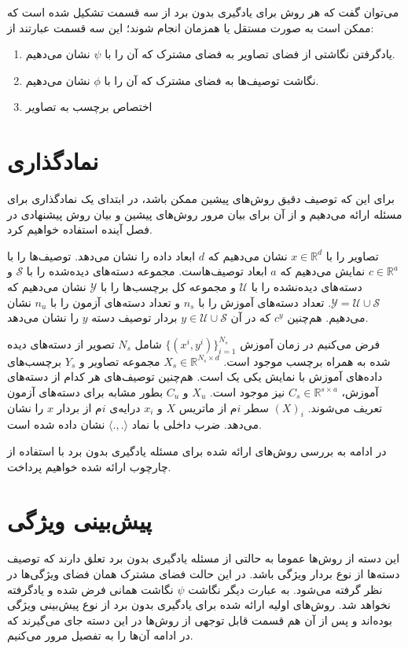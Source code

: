  می‌توان گفت که هر روش برای یادگیری بدون برد از سه قسمت تشکیل شده است که ممکن است به صورت مستقل یا همزمان انجام شوند؛ این سه قسمت عبارتند از:
\begin{enumerate}
  \item یادگرفتن نگاشتی از فضای تصاویر به فضای مشترک
  که آن را با $\psi$ نشان می‌دهیم.
  \item نگاشت توصیف‌ها به فضای مشترک
  که آن را با $\phi$ نشان می‌دهیم.
  \item اختصاص برچسب به تصاویر
\end{enumerate}

\section{نماد‌گذاری}\label{notaion}
برای این که توصیف دقیق روش‌های پیشین ممکن باشد، در ابتدای یک نمادگذاری برای مسئله ارائه می‌دهیم و از آن برای بیان مرور روش‌های پیشین و بیان روش پیشنهادی در فصل آینده استفاده خواهیم کرد.

 تصاویر را با
 $x \in \mathbb{R}^d$
 نشان می‌دهیم که $d$ ابعاد داده را نشان می‌دهد. توصیف‌ها را با
 $ c \in \mathbb{R}^a$
 نمایش می‌دهیم که  $a$ ابعاد توصیف‌هاست. مجموعه دسته‌های دیده‌شده را با  $ \mathcal{S}$ و دسته‌های دیده‌نشده را با $ \mathcal{U}$ و مجموعه کل برچسب‌ها را با $ \mathcal{Y}$
 نشان می‌دهیم که
 $ \mathcal{Y} =  \mathcal{U} \cup \mathcal{S} $.
 تعداد دسته‌های آموزش را با $n_s$ و تعداد دسته‌های آزمون را با $n_u$ نشان می‌دهیم.
هم‌چنین   $c^y$ که در آن    $ y \in \mathcal{U} \cup \mathcal{S} $ بردار توصیف دسته $y$ را نشان می‌دهد.

    فرض می‌کنیم در زمان آموزش $ \{ (x^i, y^i) \}_{i=1}^{N_s} $ شامل $N_s$ تصویر از دسته‌های دیده شده به همراه برچسب  موجود است.
     $X_s \in \mathbb{R}^{N_s \times d}$
  مجموعه تصاویر و $Y_s$ برچسب‌های داده‌های آموزش با نمایش یکی یک
   است. هم‌چنین توصیف‌های هر کدام از دسته‌های آموزش،
  $C_s \in \mathbb{R}^{s \times a}$
 نیز موجود است. $X_u$ و $C_u$ بطور مشابه برای دسته‌های آزمون تعریف می‌شوند.  $(X)_i$ سطر $i$م از ماتریس $X$ و $x_i$ درایه‌ی $i$م از بردار $x$ را نشان می‌دهد. ضرب داخلی با نماد  $\langle ., . \rangle $ نشان داده شده است.

در ادامه به بررسی روش‌های ارائه شده برای مسئله یادگیری بدون برد با استفاده از چارچوب ارائه شده خواهیم پرداخت.
\section{پیش‌بینی ویژگی  }
این دسته از روش‌ها عموما به حالتی از مسئله یادگیری بدون برد تعلق دارند که توصیف دسته‌ها از نوع بردار ویژگی باشد. در این حالت فضای مشترک همان فضای ویژگی‌ها در نظر گرفته می‌شود. به عبارت دیگر نگاشت $\psi$ نگاشت همانی فرض شده و یادگرفته نخواهد شد. روش‌های اولیه ارائه شده برای یادگیری بدون برد از نوع پیش‌بینی ویژگی
بوده‌اند و پس از آن‌ هم قسمت قابل توجهی از روش‌ها در این دسته جای می‌گیرند که در ادامه آن‌ها را به تفصیل مرور می‌کنیم.

